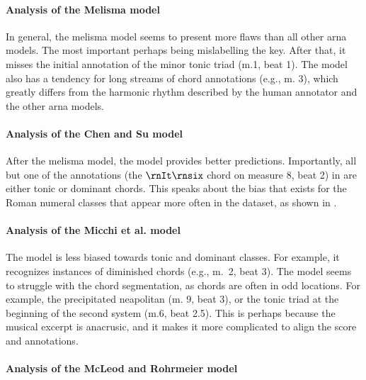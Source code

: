 \paragraph{Analysis of the Melisma model}

In general, the \gls{melisma} model seems to present more
flaws than all other \gls{arna} models. The most important
perhaps being mislabelling the key. After that, it misses
the initial annotation of the minor tonic triad (m.1, beat
1). The model also has a tendency for long streams of chord
annotations (e.g., m. 3), which greatly differs from the
harmonic rhythm described by the human annotator and the
other \gls{arna} models. 

\paragraph{Analysis of the Chen and Su model}

After the \gls{melisma} model, the \textcite{chen2021attend}
model provides better predictions. Importantly, all but one
of the annotations (the $\rnIt\rnsix$ chord on measure 8,
beat 2) in \textcite{chen2021attend} are either tonic or
dominant chords. This speaks about the bias that exists for
the Roman numeral classes that appear more often in the
dataset, as shown in . 

\paragraph{Analysis of the Micchi et al. model}

The \textcite{micchi2021deep} model is less biased towards
tonic and dominant classes. For example, it recognizes
instances of diminished chords (e.g., m.~2, beat 3). The
model seems to struggle with the chord segmentation, as
chords are often in odd locations. For example, the
precipitated \gls{neapolitan} (m. 9, beat 3), or the tonic
triad at the beginning of the second system (m.6, beat 2.5).
This is perhaps because the musical excerpt is anacrusic,
and it makes it more complicated to align the score and
annotations. 

\paragraph{Analysis of the McLeod and Rohrmeier model}

